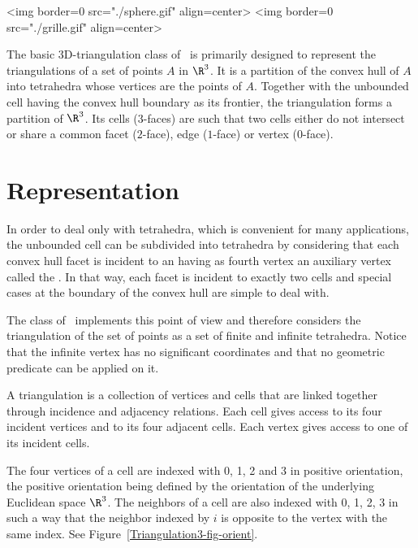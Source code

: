 \begin{ccHtmlOnly}
<img border=0 src="./sphere.gif" align=center>
<img border=0 src="./grille.gif" align=center>
\end{ccHtmlOnly}

The basic 3D-triangulation class of \cgal\ is primarily designed to
represent the triangulations of a set of points $A$ in $\R^3$.  It is
a partition of the convex hull of {$A$} into tetrahedra whose vertices
are the points of {$A$}.  Together with the unbounded cell having the
convex hull boundary as its frontier, the triangulation forms a
partition of $\R^3$. Its cells ($3$-faces) are such that two cells
either do not intersect or share a common facet ($2$-face), edge
($1$-face) or vertex ($0$-face).

\section{Representation}
\label{Triangulation3-sec-intro}

In order to deal
only with tetrahedra, which is convenient for many applications, the
unbounded cell can be subdivided into tetrahedra by considering that
each convex hull facet is incident to an  having as
fourth vertex an auxiliary vertex called the .  In
that way, each facet is incident to exactly two cells and special cases
at the boundary of the convex hull are simple to deal with.

The class  of \cgal\ implements this
point of view and therefore considers the triangulation of the set
of points as a set of finite and infinite tetrahedra.  Notice that the
infinite vertex has no significant coordinates and that no
geometric predicate can be applied on it.

A triangulation is a collection of vertices and cells that are linked
together through incidence and adjacency relations. Each cell gives
access to its four incident vertices and to its four adjacent
cells. Each vertex gives access to one of its incident cells.

The four vertices of a cell are indexed with 0, 1, 2 and 3 in positive
orientation, the positive orientation being defined by the orientation
of the underlying Euclidean space $\R^3$. The neighbors of a cell are also
indexed with 0, 1, 2, 3 in such a way that the neighbor indexed by $i$
is opposite to the vertex with the same index. See
Figure~\ref{Triangulation3-fig-orient}.

